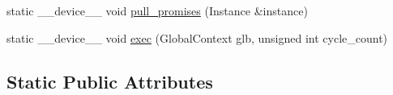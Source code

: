 \begin{DoxyCompactItemize}
\item 
static \-\_\-\-\_\-device\-\_\-\-\_\- void \hyperlink{structHarmonizeProgram_3_01PromiseUnion_3_01FN__IDS_8_8_8_4_00	PROGRAM__STATE_00	ADR__TYPE_00	ST96305cc1a177b714bc64a5044f46c97c_a99657bf0d0a38e22e276a236655ed54d}{pull\-\_\-promises} (Instance \&instance)
\item 
static \-\_\-\-\_\-device\-\_\-\-\_\- void \hyperlink{structHarmonizeProgram_3_01PromiseUnion_3_01FN__IDS_8_8_8_4_00	PROGRAM__STATE_00	ADR__TYPE_00	ST96305cc1a177b714bc64a5044f46c97c_a28719ea537980d3dd0669313b830377e}{exec} (Global\-Context glb, unsigned int cycle\-\_\-count)
\end{DoxyCompactItemize}
\subsection*{Static Public Attributes}
